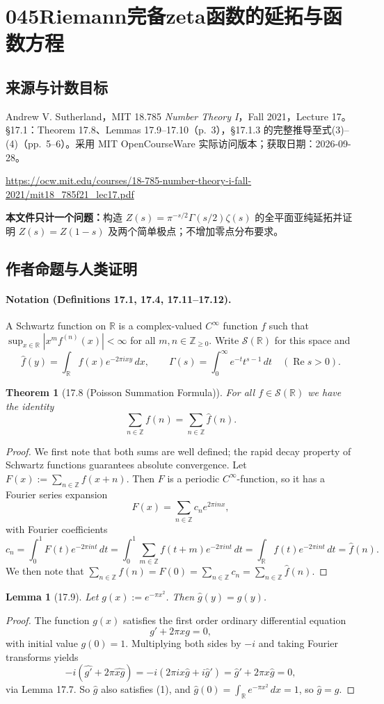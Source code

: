 \documentclass[UTF8,11pt]{ctexart}
\newtheorem*{theorem}{Theorem}
\newtheorem*{lemma}{Lemma}
\theoremstyle{definition}
\newcommand{\R}{\mathbb R}
\newcommand{\Z}{\mathbb Z}
\begin{document}
\section*{045\quad Riemann完备zeta函数的延拓与函数方程}
\subsection*{来源与计数目标}
Andrew V. Sutherland，MIT 18.785 \emph{Number Theory I}，Fall 2021，Lecture 17。\S17.1：Theorem 17.8、Lemmas 17.9--17.10（p.~3），\S17.1.3 的完整推导至式(3)--(4)（pp.~5--6）。采用 MIT OpenCourseWare 实际访问版本；获取日期：2026-09-28。
\par\url{https://ocw.mit.edu/courses/18-785-number-theory-i-fall-2021/mit18_785f21_lec17.pdf}
\par\textbf{本文件只计一个问题：}构造 $Z(s)=\pi^{-s/2}\Gamma(s/2)\zeta(s)$ 的全平面亚纯延拓并证明 $Z(s)=Z(1-s)$ 及两个简单极点；不增加零点分布要求。
\subsection*{作者命题与人类证明}
\paragraph{Notation (Definitions 17.1, 17.4, 17.11--17.12).}
A Schwartz function on $\R$ is a complex-valued $C^\infty$ function $f$ such that $\sup_{x\in\R}|x^m f^{(n)}(x)|<\infty$ for all $m,n\in\Z_{\geq0}$. Write $\mathcal S(\R)$ for this space and
\[
\widehat f(y)=\int_\R f(x)e^{-2\pi ixy}\,dx,\qquad
\Gamma(s)=\int_0^\infty e^{-t}t^{s-1}\,dt\quad(\operatorname{Re}s>0).
\]
\begin{theorem}[17.8 (Poisson Summation Formula)]
For all $f\in\mathcal S(\R)$ we have the identity
\[
\sum_{n\in\Z}f(n)=\sum_{n\in\Z}\widehat f(n).
\]
\end{theorem}
\begin{proof}
We first note that both sums are well defined; the rapid decay property of Schwartz functions guarantees absolute convergence. Let $F(x):=\sum_{n\in\Z}f(x+n)$. Then $F$ is a periodic $C^\infty$-function, so it has a Fourier series expansion
\[
F(x)=\sum_{n\in\Z}c_ne^{2\pi inx},
\]
with Fourier coefficients
\[
c_n=\int_0^1 F(t)e^{-2\pi int}\,dt
=\int_0^1\sum_{m\in\Z}f(t+m)e^{-2\pi int}\,dt
=\int_\R f(t)e^{-2\pi int}\,dt=\widehat f(n).
\]
We then note that $\sum_{n\in\Z}f(n)=F(0)=\sum_{n\in\Z}c_n=\sum_{n\in\Z}\widehat f(n)$.
\end{proof}
\begin{lemma}[17.9]
Let $g(x):=e^{-\pi x^2}$. Then $\widehat g(y)=g(y)$.
\end{lemma}
\begin{proof}
The function $g(x)$ satisfies the first order ordinary differential equation
\[
g'+2\pi xg=0,\tag{1}
\]
with initial value $g(0)=1$. Multiplying both sides by $-i$ and taking Fourier transforms yields
\[
-i(\widehat {g'}+2\pi\widehat{xg})=-i(2\pi ix\widehat g+i\widehat g')=\widehat g'+2\pi x\widehat g=0,
\]
via Lemma 17.7. So $\widehat g$ also satisfies (1), and $\widehat g(0)=\int_\R e^{-\pi x^2}\,dx=1$, so $\widehat g=g$.
\end{proof}
\end{document}
